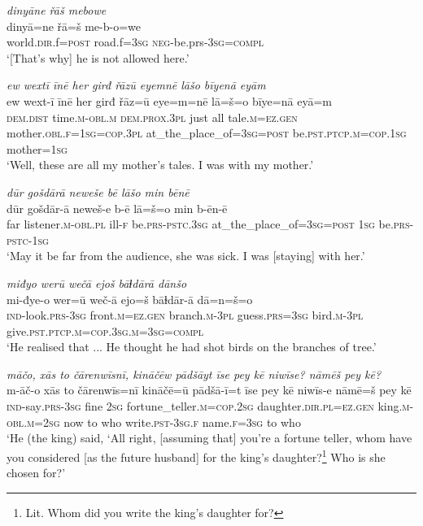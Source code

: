 \ea \label{ŠJ.108}
\textit{dinyāne řāš mebowe} \\ 
\gll dinyā=ne řā=š me-b-o=we \\ 
 world\textsc{.dir}.f\textsc{=\textsc{post}} road.f\textsc{=3sg} \textsc{neg-}be.prs\textsc{-3sg}\textsc{=compl} \\ 
\glt `[That’s why] he is not allowed here.'
\z 
 
\ea \label{KŠ.1}
\textit{ew wextī īnē her girđ řāzū eyemnē lāšo bīyenā eyām} \\ 
\gll ew wext-ī īnē her girđ řāz=ū eye=m=nē lā=š=o bīye=nā eyā=m \\ 
 \textsc{dem.dist} time\textsc{.m}\textsc{-obl}\textsc{.m} \textsc{dem.prox}\textsc{.3pl} just all tale\textsc{.m}\textsc{=ez.gen} mother\textsc{.obl}\textsc{.f}\textsc{=\textsc{1sg}}\textsc{=cop}\textsc{.3pl} at\_the\_place\_of\textsc{=3sg}\textsc{=\textsc{post}} be\textsc{.pst}\textsc{.ptcp}\textsc{.m}\textsc{=cop}\textsc{.\textsc{1sg}} mother\textsc{=\textsc{1sg}} \\ 
\glt `Well, these are all my mother’s tales. I was with my mother.'
\z 
 
\ea \label{KŠ.2}
\textit{dūr gošdārā neweše bē lāšo min bēnē} \\ 
\gll dūr gošdār-ā neweš-e b-ē lā=š=o min b-ēn-ē \\ 
 far listener\textsc{.m}\textsc{-obl}\textsc{.pl} ill\textsc{-f} be\textsc{.prs}\textsc{-pstc}\textsc{.3sg} at\_the\_place\_of\textsc{=3sg}\textsc{=\textsc{post}} \textsc{1sg} be\textsc{.prs}\textsc{-pstc}\textsc{-\textsc{1sg}} \\ 
\glt `May it be far from the audience, she was sick. I was [staying] with her.'
\z 
 
\ea \label{KŠ.5}
\textit{miđyo werū wečā ejoš bāɫdārā dānšo} \\ 
\gll mi-đye-o wer=ū weč-ā ejo=š bāɫdār-ā dā=n=š=o \\ 
 \textsc{ind-}look\textsc{.prs}\textsc{-3sg} front\textsc{.m}\textsc{=ez.gen} branch\textsc{.m}\textsc{-3pl} guess\textsc{.prs}\textsc{=3sg} bird\textsc{.m}\textsc{-3pl} give\textsc{.pst}\textsc{.ptcp}\textsc{.m}\textsc{=cop}\textsc{.3sg}\textsc{.m}\textsc{=3sg}\textsc{=compl} \\ 
\glt `He realised that ... He thought he had shot birds on the branches of tree.'
\z 
 
\ea \label{KŠ.12}
\textit{māčo, xās to čārenwīsnī, kināčēw pādšāyt īse pey kē niwīse? nāmēš pey kē?} \\ 
\gll m-āč-o xās to čārenwīs=nī kināčē=ū pādšā-ī=t īse pey kē niwīs-e nāmē=š pey kē \\ 
 \textsc{ind-}say\textsc{.prs}\textsc{-3sg} fine \textsc{2sg} fortune\_teller\textsc{.m}\textsc{=cop}\textsc{.\textsc{2sg}} daughter\textsc{.dir}\textsc{.pl}\textsc{=ez.gen} king\textsc{.m}\textsc{-obl}\textsc{.m}\textsc{=\textsc{2sg}} now to who write\textsc{.pst}\textsc{-3sg}\textsc{.f} name\textsc{.f}\textsc{=3sg} to who \\ 
\glt `He (the king) said, ‘All right, [assuming that] you’re a fortune teller, whom have you considered [as the future husband] for the king’s daughter?\footnote{Lit. Whom did you write the king’s daughter for?} Who is she chosen for?'
\z 
 
